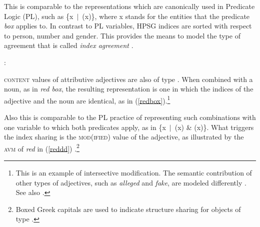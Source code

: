 \documentclass[output=paper
	        ,collection
	        ,collectionchapter
 	        ,biblatex
                ,babelshorthands
                ,newtxmath
                ,draftmode
                ,colorlinks, citecolor=brown
]{langscibook}
\begin{document}
\ea\label{red} 
\z

\noindent
This is comparable to the representations which are canonically used in 
Predicate Logic (PL), such as \{x~$|$~(x)\}, where x stands for 
the entities that the predicate \emph{box} applies to. In contrast to 
PL variables, HPSG indices are sorted with respect to person, number 
and gender. This provides the means to model the type of agreement that 
is called \emph{index agreement} .

\begin{exe} 
\ex  {}: \begin{avm}
                     \end{avm} 
\end{exe} 

\textsc{content} values of attributive adjectives are also of type . 
When combined with a noun, as in \emph{red box}, the resulting representation 
is one in which the indices of the adjective and the noun are identical, as in 
(\ref{redbox}).\footnote{This is an example of intersective modification. 
The semantic contribution of other types of adjectives, such as  
\emph{alleged} and \emph{fake}, are modeled differently \citep[330--331]{ps2}. See also
.}   

\begin{exe} 
\ex\label{redbox} 
\end{exe}

\noindent
Also this is comparable to the PL practice of representing such 
combinations with one variable to which both predicates apply, as in 
\{x~$|$~(x) \& (x)\}. What triggers the index sharing is 
the \textsc{mod(ified)} value of the adjective, as illustrated by the \textsc{avm} of 
\emph{red} in (\ref{reddd}) \citep[55]{ps2}.\footnote{Boxed Greek capitals
are used to indicate structure sharing for objects of 
type  \citep[]{GS00}.} 
\end{document}
